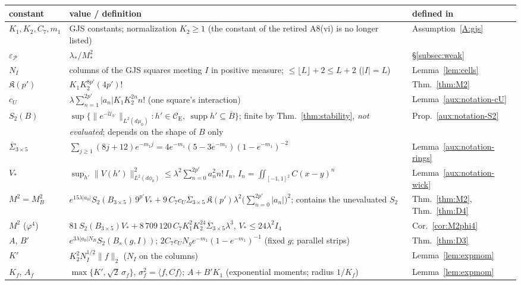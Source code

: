 \documentclass[11pt,a4paper]{article}
\theoremstyle{plain}
\theoremstyle{definition}
\theoremstyle{plain}
\theoremstyle{definition}
\newcommand{\CE}{\mathcal{C}_{\mathrm E}}
\newcommand{\ip}[2]{\langle #1,#2\rangle}
\DeclareMathOperator{\supp}{supp}
\begin{document}
\begin{center}
\small
\setlength{\tabcolsep}{4pt}
\begin{tabular}{@{}>{\raggedright}p{}>{\raggedright}p{}>{\raggedright\arraybackslash}p{}@{}}
\toprule
constant & value / definition & defined in\\
\midrule
$K_1,K_2,C_7,m_1$ & GJS constants; normalization $K_2\ge1$ (the constant of the retired A8(vi) is no longer listed) & Assumption~\ref{A:gjs}\\
$\varepsilon_{\mathscr P}$ & $\lambda_*/M_*^2$ & \S\ref{subsec:weak}\\
$N_I$ & columns of the GJS squares meeting $I$ in positive measure; $\le\lfloor L\rfloor+2\le L+2$ ($|I|=L$) & Lemma~\ref{lem:cells}\\
$\mathfrak K(p')$ & $K_1K_2^{8p'}(4p')!$ & Thm.~\ref{thm:M2}
\\
$c_U$ & $\lambda\sum_{n=1}^{2p'}|a_n|K_1K_2^{2n}n!$ (one square's interaction) & Lemma~\ref{aux:notation-cU}\\
$S_2(B)$ & $\sup\{\|e^{-\mathcal U_{h'}}\|_{L^2(d\mu_0)}:h'\in\CE,\ \supp h'\subseteq\overline B\}$; finite by Thm.~\ref{thm:stability}, \emph{not evaluated}; depends on the shape of $B$ only & Prop.~\ref{aux:notation-S2}\\
$\overline\Sigma_{3\times5}$ & $\sum_{j\ge1}(8j+12)e^{-m_1j}=4e^{-m_1}(5-3e^{-m_1})(1-e^{-m_1})^{-2}$ & Lemma~\ref{aux:notation-rings}\\
$V_*$ & $\sup_{h'}\|V(h')\|_{L^2(d\phi_0)}^2\le\lambda^2\sum_{n=0}^{2p'}a_n^2n!\,I_n$, $I_n=\iint_{[-1,1]^2}C(x-y)^n$ & Lemma~\ref{aux:notation-wick}\\
$M^2=M_B^2$ & $e^{15\lambda|a_0|}S_2(B_{3\times5})\,9^{p'}V_*+9\,C_7c_U\overline\Sigma_{3\times5}\,\mathfrak K(p')\lambda^2\bigl(\sum_{n=0}^{2p'}|a_n|\bigr)^2$; contains the unevaluated $S_2$ & Thm.~\ref{thm:M2}, Thm.~\ref{thm:D4}\\
$M^2$ ($\varphi^4$) & $81\,S_2(B_{3\times5})V_*+8\,709\,120\,C_7K_1^2K_2^{24}\overline\Sigma_{3\times5}\lambda^3$, $V_*\le24\lambda^2I_4$ & Cor.~\ref{cor:M2phi4}\\
$A$, $B'$ & $e^{3\lambda|a_0|N_B}S_2(B_s(g,I))$; $2C_7c_UN_ge^{-m_1}(1-e^{-m_1})^{-1}$ (fixed $g$; parallel strips) & Thm.~\ref{thm:D3}\\
$K'$ & $K_2^{2}N_I^{1/2}\|f\|_2$ ($N_I$ on the columns) & Lemma~\ref{lem:expmom}\\
$K_f$, $A_f$ & $\max\{K',\sqrt2\,\sigma_f\}$, $\sigma_f^2=\ip f{Cf}$; $A+B'K_1$ (exponential moments; radius $1/K_f$) & Lemma~\ref{lem:expmom}\\

\end{tabular}
\end{center}
\end{document}
